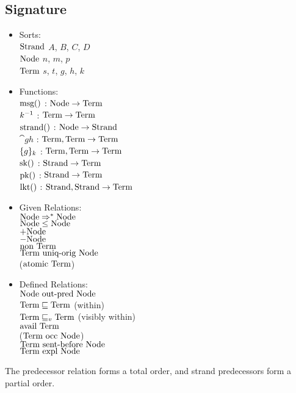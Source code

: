 \documentclass{article}
\begin{document}
\subsection{Signature}

\begin{itemize}

\item Sorts: \\
$\mbox{Strand}$ $A$, $B$, $C$, $D$ \\
$\mbox{Node}$ $n$, $m$, $p$ \\
$\mbox{Term}$ $s$, $t$, $g$, $h$, $k$

\item Functions: \\
$\mbox{msg}()$ : $\mbox{Node} \to \mbox{Term}$ \\
$k^{-1}$ : $\mbox{Term} \to \mbox{Term}$ \\
$\mbox{strand}()$ : $\mbox{Node} \to \mbox{Strand}$ \\
$\cat{g}{h}$ : $\mbox{Term}, \mbox{Term} \to \mbox{Term}$ \\
$\{g\}_{k}$ : $\mbox{Term}, \mbox{Term} \to \mbox{Term}$ \\
$\mbox{sk}()$ : $\mbox{Strand} \to \mbox{Term}$ \\
$\mbox{pk}()$ : $\mbox{Strand} \to \mbox{Term}$ \\
$\mbox{lkt}(){}$ : $\mbox{Strand}, \mbox{Strand} \to \mbox{Term}$

\item Given Relations: \\
$\mbox{Node} \Rightarrow^* \mbox{Node}$ \\
$\mbox{Node} \leq \mbox{Node}$ \\
$+\mbox{Node}$ \\
$-\mbox{Node}$ \\
$\mbox{non } \mbox{Term}$ \\
$\mbox{Term} \mbox{ uniq-orig } \mbox{Node}$ \\
($\mbox{atomic } \mbox{Term}$)

\item Defined Relations: \\
$\mbox{Node} \mbox{ out-pred } \mbox{Node}$ \\
$\mbox{Term} \sqsubseteq \mbox{Term}$ (within) \\
$\mbox{Term} \sqsubseteq_v \mbox{Term}$ (visibly within) \\
$\mbox{avail } \mbox{Term}$ \\
($\mbox{Term} \mbox{ occ } \mbox{Node}$) \\
$\mbox{Term} \mbox{ sent-before } \mbox{Node}$ \\
$\mbox{Term} \mbox{ expl } \mbox{Node}$

\end{itemize}

The predecessor relation forms a total order, and strand predecessors
form a partial order.
\end{document}
